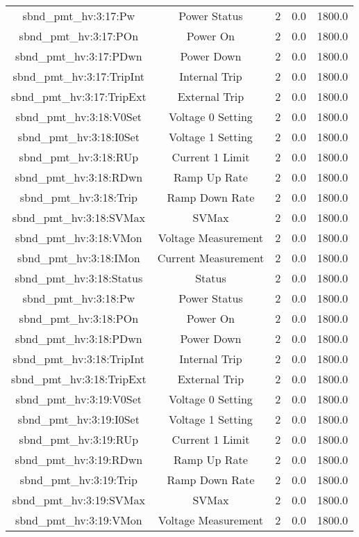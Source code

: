 \begin{center}
\begin{longtable}{c | c c c c }
sbnd\_pmt\_hv:3:17:Pw & Power Status & 2 & 0.0 & 1800.0\\ 
sbnd\_pmt\_hv:3:17:POn & Power On & 2 & 0.0 & 1800.0\\ 
sbnd\_pmt\_hv:3:17:PDwn & Power Down & 2 & 0.0 & 1800.0\\ 
sbnd\_pmt\_hv:3:17:TripInt & Internal Trip & 2 & 0.0 & 1800.0\\ 
sbnd\_pmt\_hv:3:17:TripExt & External Trip & 2 & 0.0 & 1800.0\\ 
sbnd\_pmt\_hv:3:18:V0Set & Voltage 0 Setting & 2 & 0.0 & 1800.0\\ 
sbnd\_pmt\_hv:3:18:I0Set & Voltage 1 Setting & 2 & 0.0 & 1800.0\\ 
sbnd\_pmt\_hv:3:18:RUp & Current 1 Limit & 2 & 0.0 & 1800.0\\ 
sbnd\_pmt\_hv:3:18:RDwn & Ramp Up Rate & 2 & 0.0 & 1800.0\\ 
sbnd\_pmt\_hv:3:18:Trip & Ramp Down Rate & 2 & 0.0 & 1800.0\\ 
sbnd\_pmt\_hv:3:18:SVMax & SVMax & 2 & 0.0 & 1800.0\\ 
sbnd\_pmt\_hv:3:18:VMon & Voltage Measurement & 2 & 0.0 & 1800.0\\ 
sbnd\_pmt\_hv:3:18:IMon & Current Measurement & 2 & 0.0 & 1800.0\\ 
sbnd\_pmt\_hv:3:18:Status & Status & 2 & 0.0 & 1800.0\\ 
sbnd\_pmt\_hv:3:18:Pw & Power Status & 2 & 0.0 & 1800.0\\ 
sbnd\_pmt\_hv:3:18:POn & Power On & 2 & 0.0 & 1800.0\\ 
sbnd\_pmt\_hv:3:18:PDwn & Power Down & 2 & 0.0 & 1800.0\\ 
sbnd\_pmt\_hv:3:18:TripInt & Internal Trip & 2 & 0.0 & 1800.0\\ 
sbnd\_pmt\_hv:3:18:TripExt & External Trip & 2 & 0.0 & 1800.0\\ 
sbnd\_pmt\_hv:3:19:V0Set & Voltage 0 Setting & 2 & 0.0 & 1800.0\\ 
sbnd\_pmt\_hv:3:19:I0Set & Voltage 1 Setting & 2 & 0.0 & 1800.0\\ 
sbnd\_pmt\_hv:3:19:RUp & Current 1 Limit & 2 & 0.0 & 1800.0\\ 
sbnd\_pmt\_hv:3:19:RDwn & Ramp Up Rate & 2 & 0.0 & 1800.0\\ 
sbnd\_pmt\_hv:3:19:Trip & Ramp Down Rate & 2 & 0.0 & 1800.0\\ 
sbnd\_pmt\_hv:3:19:SVMax & SVMax & 2 & 0.0 & 1800.0\\ 
sbnd\_pmt\_hv:3:19:VMon & Voltage Measurement & 2 & 0.0 & 1800.0\\ 

\end{longtable}
\end{center}
